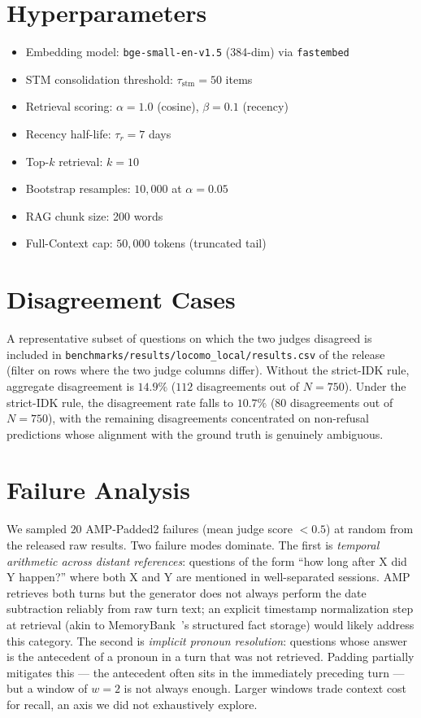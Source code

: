 \section{Hyperparameters}
\label{app:hyperparams}

\begin{itemize}
    \item Embedding model: \texttt{bge-small-en-v1.5} (384-dim) via \texttt{fastembed}
    \item STM consolidation threshold: $\tau_{\text{stm}} = 50$ items
    \item Retrieval scoring: $\alpha = 1.0$ (cosine), $\beta = 0.1$ (recency)
    \item Recency half-life: $\tau_r = 7$ days
    \item Top-$k$ retrieval: $k = 10$
    \item Bootstrap resamples: $10{,}000$ at $\alpha = 0.05$
    \item RAG chunk size: 200 words
    \item Full-Context cap: $50{,}000$ tokens (truncated tail)
\end{itemize}

\section{Disagreement Cases}
\label{app:disagreement}

A representative subset of questions on which the two judges disagreed is included in \texttt{benchmarks/results/locomo\_local/results.csv} of the release (filter on rows where the two judge columns differ). Without the strict-IDK rule, aggregate disagreement is $14.9\%$ ($112$ disagreements out of $N = 750$). Under the strict-IDK rule, the disagreement rate falls to $10.7\%$ ($80$ disagreements out of $N = 750$), with the remaining disagreements concentrated on non-refusal predictions whose alignment with the ground truth is genuinely ambiguous.

\section{Failure Analysis}
\label{app:failures}

We sampled $20$ AMP-Padded2 failures (mean judge score $< 0.5$) at random from the released raw results. Two failure modes dominate. The first is \emph{temporal arithmetic across distant references}: questions of the form ``how long after X did Y happen?'' where both X and Y are mentioned in well-separated sessions. AMP retrieves both turns but the generator does not always perform the date subtraction reliably from raw turn text; an explicit timestamp normalization step at retrieval (akin to MemoryBank~\citep{memorybank}'s structured fact storage) would likely address this category. The second is \emph{implicit pronoun resolution}: questions whose answer is the antecedent of a pronoun in a turn that was not retrieved. Padding partially mitigates this --- the antecedent often sits in the immediately preceding turn --- but a window of $w = 2$ is not always enough. Larger windows trade context cost for recall, an axis we did not exhaustively explore.
